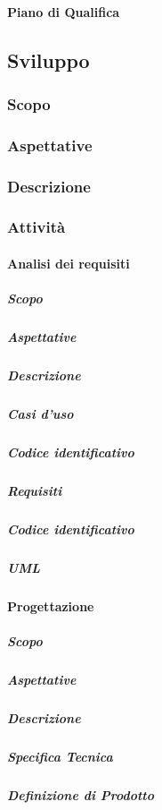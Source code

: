 		\paragraph{Piano di Qualifica}
	
\subsection{Sviluppo}
	\subsubsection{Scopo}
	\subsubsection{Aspettative}
	\subsubsection{Descrizione}
	\subsubsection{Attività}
		\paragraph{Analisi dei requisiti}
			\subparagraph{Scopo}
			\subparagraph{Aspettative}
			\subparagraph{Descrizione}
			\subparagraph{Casi d'uso}
			\subparagraph{Codice identificativo}
			\subparagraph{Requisiti}
			\subparagraph{Codice identificativo}
			\subparagraph{UML}
		\paragraph{Progettazione}
			\subparagraph{Scopo}
			\subparagraph{Aspettative}
			\subparagraph{Descrizione}
			\subparagraph{Specifica Tecnica}
			\subparagraph{Definizione di Prodotto}
